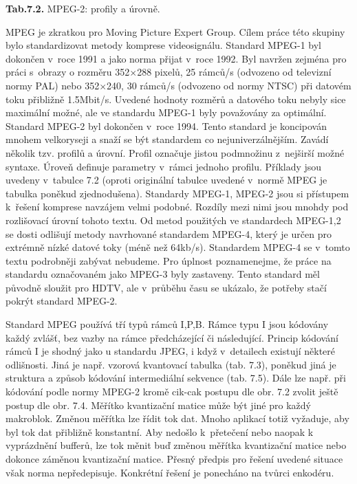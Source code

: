 \textbf{Tab.7.2.} MPEG-2: profily a úrovně.

\noindent MPEG je zkratkou pro Moving Picture Expert Group. Cílem práce této skupiny bylo standardizovat metody komprese videosignálu. Standard MPEG-1 byl dokončen v~roce 1991 a jako norma přijat v~roce 1992. Byl navržen zejména pro práci s~obrazy o rozměru 352$\times$288 pixelů, 25 rámců/s (odvozeno od televizní normy PAL) nebo 352$\times$240, 30 rámců/s (odvozeno od normy NTSC) při datovém toku přibližně 1.5Mbit/s. Uvedené hodnoty rozměrů a datového toku nebyly sice maximální možné, ale ve standardu MPEG-1 byly považovány za optimální. Standard MPEG-2 byl dokončen v~roce 1994. Tento standard je koncipován mnohem velkoryseji a snaží se být standardem co nejuniverzálnějším. Zavádí několik tzv. profilů a úrovní. Profil označuje jistou podmnožinu z~nejširší možné syntaxe. Úroveň definuje parametry v~rámci jednoho profilu. Příklady jsou uvedeny v~tabulce 7.2 (oproti originální tabulce uvedené v~normě MPEG je tabulka poněkud zjednodušena). Standardy MPEG-1, MPEG-2 jsou si přístupem k~řešení komprese navzájem velmi podobné. Rozdíly mezi nimi jsou mnohdy pod rozlišovací úrovní tohoto textu. Od metod použitých ve standardech MPEG-1,2 se dosti odlišují metody navrhované standardem MPEG-4, který je určen pro extrémně nízké datové toky (méně než 64kb/s). Standardem MPEG-4 se v~tomto textu podrobněji zabývat nebudeme. Pro úplnost poznamenejme, že práce na standardu označovaném jako MPEG-3 byly zastaveny. Tento standard měl původně sloužit pro HDTV, ale v~průběhu času se ukázalo, že potřeby stačí pokrýt standard MPEG-2.

\noindent 

\noindent Standard MPEG používá tří typů rámců I,P,B. Rámce typu I jsou kódovány každý zvlášť, bez vazby na rámce předcházející či následující. Princip kódování rámců I je shodný jako u standardu JPEG, i když v~detailech existují některé odlišnosti. Jiná je např. vzorová kvantovací tabulka (tab. 7.3), poněkud jiná je struktura a způsob kódování intermediální sekvence (tab. 7.5). Dále lze např. při kódování podle normy MPEG-2 kromě cik-cak postupu dle obr. 7.2 zvolit ještě postup dle obr. 7.4. Měřítko kvantizační matice může být jiné pro každý makroblok. Změnou měřítka lze řídit tok dat. Mnoho aplikací totiž vyžaduje, aby byl tok dat přibližně konstantní. Aby nedošlo k~přetečení nebo naopak k vyprázdnění bufferů, lze tok měnit buď změnou měřítka kvantizační matice nebo dokonce záměnou kvantizační matice. Přesný předpis pro řešení uvedené situace však norma nepředepisuje. Konkrétní řešení je ponecháno na tvůrci enkodéru.

